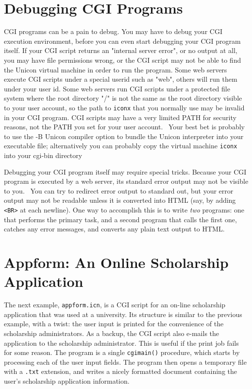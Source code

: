 \section{Debugging CGI Programs}

CGI programs can be a pain to debug. You may have to debug your CGI
execution environment, before you can even start debugging your CGI
program itself. If your CGI script returns an "internal
server error", or no output at all, you may have file
permissions wrong, or the CGI script may not be able to find the Unicon
virtual machine in order to run the program. Some web servers execute
CGI scripts under a special userid such as
"web", others will run them under your user
id. Some web servers run CGI scripts under a protected file system
where the root directory "/" is not the
same as the root directory visible to your user account, so the path to
\texttt{iconx} that you normally use may be invalid in your CGI program. CGI
scripts may have a very limited PATH for security reasons, not the PATH
you set for your user account. \ Your best bet is probably to use the
-B Unicon compiler option to bundle the Unicon interpreter into your
executable file; alternatively you can probably copy the virtual
machine \texttt{iconx} into your cgi-bin directory

Debugging your CGI program itself may require special tricks. Because
your CGI program is executed by a web server, its standard error output
may not be visible to you. \ You can try to redirect error output to
standard out, but your error output may not be readable unless it is
converted into HTML (say, by adding
\texttt{{\textless}BR{\textgreater}} at each newline). One way to
accomplish this is to write \textit{two} programs: one that performs
the primary task, and a second program that calls the first one,
catches any error messages, and converts any plain text output to HTML.

\section{Appform: An Online Scholarship Application}

The next example, \texttt{appform.icn}, is a CGI script for an
on-line scholarship application that was used at a university. Its
structure is similar to the previous example, with a twist:
the user input is printed for the convenience of the scholarship
administrators. As a backup, the CGI script also e-mails the
application to the scholarship administrator. This is useful if the
print job fails for some reason.
The program is a single \texttt{cgimain()} procedure, which starts by
processing each of the user input fields. The program then opens a
temporary file with a \texttt{.txt} extension, and writes a nicely
formatted document containing the user's scholarship
application information.

